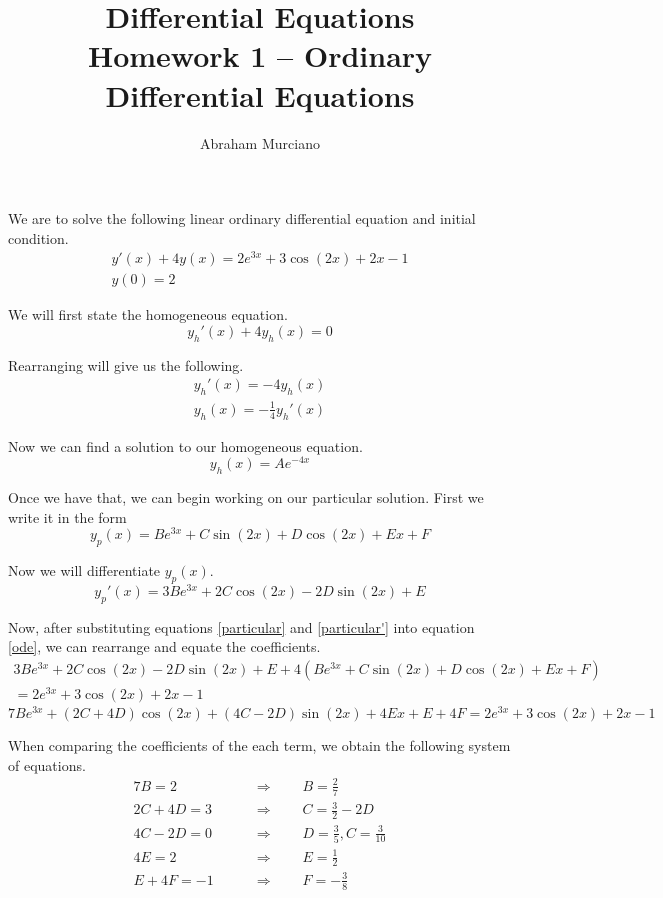 \documentclass[fleqn]{article}
\title{
	Differential Equations \\
	\medskip
	\large Homework 1 -- Ordinary Differential Equations
}
\author{Abraham Murciano}
\begin{document}
\maketitle

We are to solve the following linear ordinary differential equation and initial condition.
\begin{gather}
	y'(x) + 4y(x) = 2e^{3x} + 3\cos(2x) + 2x - 1 \label{ode} \\
	y(0) = 2 \nonumber
\end{gather}

We will first state the homogeneous equation.
\begin{equation*}
	y_h'(x) + 4y_h(x) = 0
\end{equation*}

Rearranging will give us the following.
\begin{gather*}
	y_h'(x) = -4 y_h(x) \\
	y_h(x) = -\frac{1}{4}y_h'(x)
\end{gather*}

Now we can find a solution to our homogeneous equation.
\begin{equation*}
	y_h(x) = A e^{-4x}
\end{equation*}

Once we have that, we can begin working on our particular solution. First we write it in the form
\begin{equation}
	y_p(x) = B e^{3x} + C \sin(2x) + D \cos(2x) + E x + F \label{particular}
\end{equation}

Now we will differentiate \(y_p(x)\).
\begin{equation}
	y_p'(x) = 3B e^{3x} + 2C \cos(2x) - 2D \sin(2x) + E \label{particular'}
\end{equation}

Now, after substituting equations \ref{particular} and \ref{particular'} into equation \ref{ode}, we can rearrange and equate the coefficients.
\begin{multline*}
	3B e^{3x} + 2C \cos(2x) - 2D \sin(2x) + E + 4(B e^{3x} + C \sin(2x) + D \cos(2x) + E x + F) \\
	= 2e^{3x} + 3\cos(2x) + 2x - 1
\end{multline*}
\begin{equation*}
	7B e^{3x} + (2C + 4D)\cos(2x) + (4C - 2D)\sin(2x) + 4E x + E + 4F = 2e^{3x} + 3\cos(2x) + 2x - 1
\end{equation*}

When comparing the coefficients of the each term, we obtain the following system of equations.
\begin{align*}
	7B = 2 \qquad      & \Rightarrow \qquad B = \frac{2}{7}                   \\
	2C + 4D = 3 \qquad & \Rightarrow \qquad C = \frac{3}{2} - 2D              \\
	4C - 2D = 0 \qquad & \Rightarrow \qquad D = \frac{3}{5}, C = \frac{3}{10} \\
	4E = 2 \qquad      & \Rightarrow \qquad E = \frac{1}{2}                   \\
	E + 4F = -1 \qquad & \Rightarrow \qquad F = -\frac{3}{8}
\end{align*}
\end{document}
